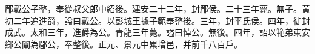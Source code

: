 \begin{pinyinscope}
 
 
 郿戴公子整，奉從叔父郎中紹後。建安二十二年，封郿侯。二十三年薨。無子。黃初二年追進爵，謚曰戴公。以彭城王據子範奉整後。三年，封平氏侯。四年，徙封成武。太和三年，進爵為公。青龍三年薨。謚曰悼公。無後。四年，詔以範弟東安鄉公闡為郿公，奉整後。正元、景元中累增邑，并前千八百戶。
 
 
\end{pinyinscope}